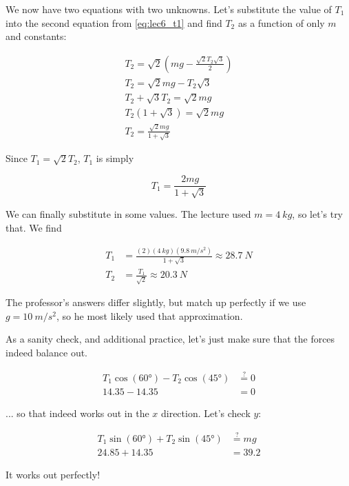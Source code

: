 We now have two equations with two unknowns. Let's substitute the value of $T_1$ into the second equation from \eqref{eq:lec6_t1} and find $T_2$ as a function of only $m$ and constants:

\begin{align}
T_2 = \sqrt{2}\left(m g - \frac{\sqrt{2} T_2 \sqrt{3}}{2}\right)\\
T_2 = \sqrt{2} m g - T_2 \sqrt{3}\\
T_2 + \sqrt{3} T_2 = \sqrt{2} m g\\
T_2 (1 + \sqrt{3}) = \sqrt{2} m g\\
T_2 = \frac{\sqrt{2} m g}{1 + \sqrt{3}}
\end{align}

Since $T_1 = \sqrt{2} T_2$, $T_1$ is simply

\begin{equation}
T_1 = \frac{2 m g}{1 + \sqrt{3}}
\end{equation}

We can finally substitute in some values. The lecture used $m = \SI{4}{kg}$, so let's try that. We find

\begin{align}
T_1 &= \frac{(2)(\SI{4}{kg})(\SI{9.8}{m/s^2})}{1 + \sqrt{3}} \approx \SI{28.7}{N}\\
T_2 &= \frac{T_1}{\sqrt{2}} \approx \SI{20.3}{N}
\end{align}

The professor's answers differ slightly, but match up perfectly if we use $g = \SI{10}{m/s^2}$, so he most likely used that approximation.

As a sanity check, and additional practice, let's just make sure that the forces indeed balance out.

\begin{align}
T_1 \cos(\ang{60}) - T_2 \cos(\ang{45}) &\overset{?}{=} 0\\
14.35 - 14.35 &= 0
\end{align}

... so that indeed works out in the $x$ direction. Let's check $y$:

\begin{align}
T_1 \sin(\ang{60}) + T_2 \sin(\ang{45}) &\overset{?}{=} m g\\
24.85 + 14.35 &= 39.2
\end{align}

It works out perfectly!
